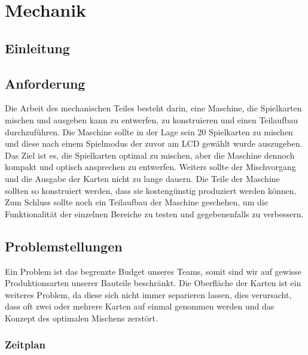 \chapter{Mechanik}
\section{Einleitung}

\section{Anforderung}
\label{sec:Anforderung}
Die Arbeit des mechanischen Teiles besteht darin, eine Maschine,
die Spielkarten mischen und ausgeben kann zu entwerfen, zu konstruieren
und einen Teilaufbau durchzuführen. Die Maschine sollte in der Lage
sein 20 Spielkarten zu mischen und diese nach einem Spielmodus der
zuvor am LCD gewählt wurde auszugeben. Das Ziel ist es, die Spielkarten
optimal zu mischen, aber die Maschine dennoch kompakt und optisch
ansprechen zu entwerfen. Weiters sollte der Mischvorgang und die
Ausgabe der Karten nicht zu lange dauern. Die Teile der Maschine
sollten so konstruiert werden, dass sie kostengünstig produziert
werden können. Zum Schluss sollte noch ein Teilaufbau der Maschine
geschehen, um die Funktionalität der einzelnen Bereiche zu testen
und gegebenenfalls zu verbessern.

\section{Problemstellungen}
Ein Problem ist das begrenzte Budget unseres Teams, somit sind
wir auf gewisse Produktionsarten unserer Bauteile beschränkt.
Die Oberfläche der Karten ist ein
weiteres Problem, da diese sich nicht immer separieren lassen, dies
verursacht, dass oft zwei oder mehrere Karten auf einmal genommen
werden und das Konzept des optimalen Mischens zerstört.

\subsection{Zeitplan}

